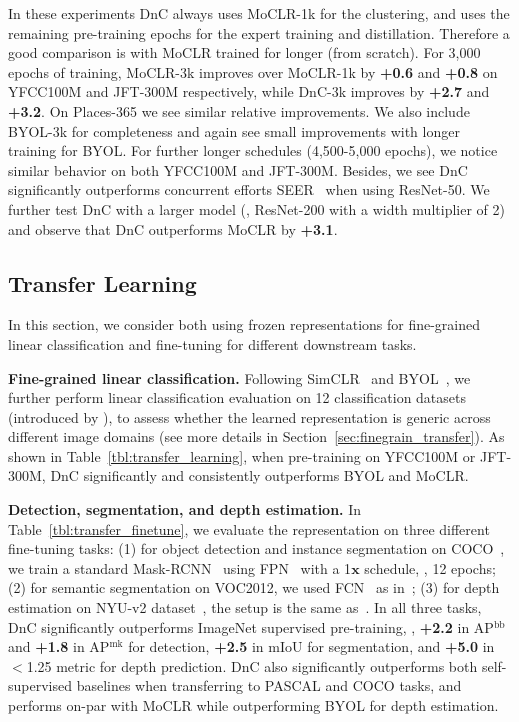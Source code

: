 \documentclass[final]{cvpr}
\newcommand\showdiff[1]{\textbf{\textcolor{nicergreen}{#1}}}
\newcommand\baseline{MoCLR}
\newcommand\jft{JFT-300M}
\newcommand{\apbbox}[1]{AP$^\text{bb}_\text{#1}$}
\newcommand{\apmask}[1]{AP$^\text{mk}_\text{#1}$}
\begin{document}
In these experiments DnC always uses \baseline{}-1k for the clustering, and uses the remaining pre-training epochs for the expert training and distillation. Therefore a good comparison is with \baseline{} trained for longer (from scratch). For 3,000 epochs of training, \baseline{}-3k improves over \baseline{}-1k by \showdiff{+0.6} and \showdiff{+0.8} on YFCC100M and \jft{} respectively, while DnC-3k improves by \showdiff{+2.7} and \showdiff{+3.2}. On Places-365 we see similar relative improvements. We also include BYOL-3k for completeness and again see small improvements with longer training for BYOL. For further longer schedules (4,500-5,000 epochs), we notice similar behavior on both YFCC100M and \jft{}. Besides, we see DnC significantly outperforms concurrent efforts SEER~\cite{goyal2021self} when using ResNet-50. We further test DnC with a larger model (\ie, ResNet-200 with a width multiplier of 2) and observe that DnC outperforms \baseline{} by \showdiff{+3.1}.

\subsection{Transfer Learning}

In this section, we consider both using frozen representations for fine-grained linear classification and fine-tuning for different downstream tasks.

\noindent\textbf{Fine-grained linear classification.}
Following SimCLR~\cite{chen2020simple} and BYOL~\cite{grill2020bootstrap}, we further perform linear classification evaluation on 12 classification datasets (introduced by \cite{kornblith2019better}), to assess whether the learned representation is generic across different image domains (see more details in Section~\ref{sec:finegrain_transfer}). As shown in Table~\ref{tbl:transfer_learning}, when pre-training on YFCC100M or \jft{}, DnC significantly and consistently outperforms BYOL and \baseline{}. 


\noindent\textbf{Detection, segmentation, and depth estimation.} In Table~\ref{tbl:transfer_finetune}, we evaluate the representation on three different fine-tuning tasks: (1) for object detection and instance segmentation on COCO~\cite{lin2014microsoft}, we train a standard Mask-RCNN~\cite{he2017mask} using FPN~\cite{lin2017feature} with a 1$\mathbf{x}$ schedule, \ie, 12 epochs; (2) for semantic segmentation on VOC2012, we used FCN~\cite{long2015fully} as in~\cite{he2020momentum}; (3) for depth estimation on NYU-v2 dataset~\cite{silberman2012indoor}, the setup is the same as~\cite{grill2020bootstrap}. In all three tasks, DnC significantly outperforms ImageNet supervised pre-training, \eg, \showdiff{+2.2} in \apbbox{~} and \showdiff{+1.8} in \apmask{~} for detection, \showdiff{+2.5} in mIoU for segmentation, and \showdiff{+5.0} in $<$1.25 metric for depth prediction. DnC also significantly outperforms both self-supervised baselines when transferring to PASCAL and COCO tasks, and performs on-par with MoCLR while outperforming BYOL for depth estimation. 
\end{document}
